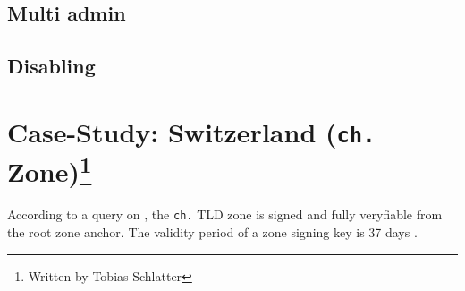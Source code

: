 \documentclass[a4paper]{scrartcl}
\newcommand{\wbts}{\protect\footnote{Written by Tobias Schlatter}}
\begin{document}
\subsection{Multi admin}
\subsection{Disabling}

\section{Case-Study: Switzerland (\texttt{ch.} Zone)\wbts}
According to a query on \cite{secspider}, the \verb|ch.| TLD zone is signed and
fully veryfiable from the root zone anchor. The validity period of a
zone signing key is 37 days \cite{switch10}.

\nocite{*}


\end{document}

